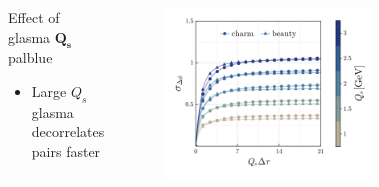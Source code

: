 \documentclass[aspectratio=169,11pt,usenames,dvipsnames]{beamer}
\begin{document}
\begin{frame}
\begin{center}
\begin{columns}[onlytextwidth,t]
\begin{figure}
            \end{figure}
            \begin{center}
                \begin{custombox2}{\normalsize Effect of glasma $\boldsymbol{Q_s}$}{palblue}
                    \small
                    \begin{varwidth}{0.95\textwidth}
                    \begin{itemize}\itemsep0em 
                        \itemsep0em
                        \footnotesize
                        \item Large $Q_s$ glasma decorrelates pairs faster
                    \end{itemize}
                    \end{varwidth}
                \end{custombox2}
            \end{center}
            \vspace{-10pt}
            \begin{figure}
                \centering
                \includegraphics[width=0.95\columnwidth]{images/sigma_dphideta_tau_charm_beauty_Qs_dep_scaled_final_azimuth.png}
            \end{figure}
        \end{columns}    
    \end{center}
\end{frame}
\end{document}
